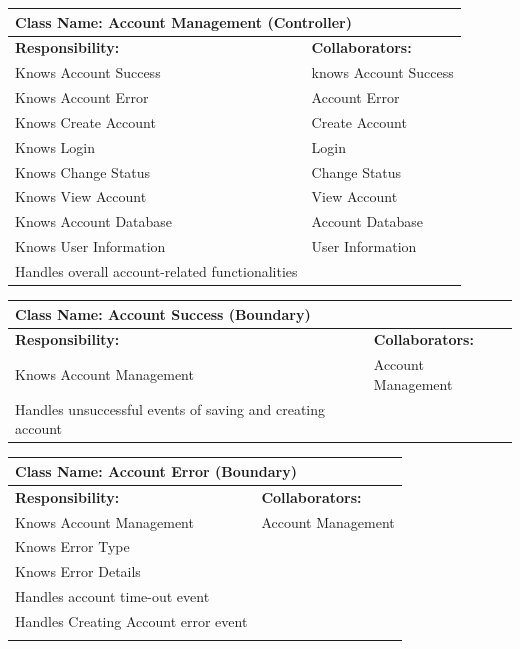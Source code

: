 \documentclass[]{article}
\begin{document}
\begin{itemize}
	\begin{table}[ht]
		\centering
		\begin{tabular}{|p{7cm}|p{7cm}|}
		\hline 
		 \multicolumn{2}{|l|}{\textbf{Class Name:} Account Management (Controller)} \\
		\hline
		\textbf{Responsibility:} & \textbf{Collaborators:} \\
		\hline
		Knows Account Success & knows Account Success\\
		Knows Account Error & Account Error \\
		Knows Create Account & Create Account\\
		Knows Login & Login\\
		Knows Change Status & Change Status\\
		Knows View Account & View Account\\
		Knows Account Database & Account Database\\
		Knows User Information &User Information\\
		Handles overall account-related functionalities
		\vspace{0.1in} & \\
		\hline
		\end{tabular}
	\end{table}

	\begin{table}[ht]
		\centering
		\begin{tabular}{|p{7cm}|p{7cm}|}
		\hline 
		 \multicolumn{2}{|l|}{\textbf{Class Name:} Account Success (Boundary)} \\
		\hline
		\textbf{Responsibility:} & \textbf{Collaborators:} \\
		\hline
		Knows Account Management & Account Management\\
		Handles unsuccessful events of saving and creating account
		\vspace{0.1in} & \\
		\hline
		\end{tabular}
	\end{table}

	\begin{table}[ht]
		\centering
		\begin{tabular}{|p{7cm}|p{7cm}|}
		\hline 
		 \multicolumn{2}{|l|}{\textbf{Class Name:} Account Error (Boundary)} \\
		\hline
		\textbf{Responsibility:} & \textbf{Collaborators:} \\
		\hline
		Knows Account Management & Account Management \\
		Knows Error Type &\\
		Knows Error Details &\\
		Handles account time-out event &\\
		Handles Creating Account error event &\\
		\vspace{0.1in} & \\
		\hline
		\end{tabular}
	\end{table}


\end{itemize}
\end{document}
